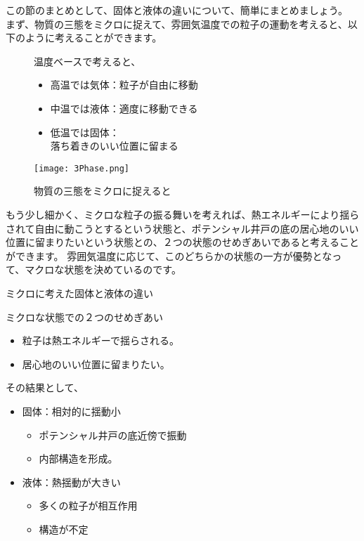 \documentclass[uplatex,dvipdfmx,a4paper,11pt]{jsarticle}
\begin{document}
この節のまとめとして、固体と液体の違いについて、簡単にまとめましょう。
まず、物質の三態をミクロに捉えて、雰囲気温度での粒子の運動を考えると、以下のように考えることができます。
\begin{figure}[htb]
	\begin{center}
		\begin{minipage}{0.48\textwidth}
			\large
			\begin{itembox}[l]{温度ベースで考えると、}
				\begin{itemize}
					\item 高温では気体：粒子が自由に移動
					\item 中温では液体：適度に移動できる
					\item 低温では固体：\\
					落ち着きのいい位置に留まる
				\end{itemize}
			\end{itembox}
		\end{minipage}
		\begin{minipage}{0.42\textwidth}
			\texttt{[image: 3Phase.png]}
		\end{minipage}
		\caption{物質の三態をミクロに捉えると}
		\label{fig:santai_micro}
	\end{center}
\end{figure}

もう少し細かく、ミクロな粒子の振る舞いを考えれば、熱エネルギーにより揺らされて自由に動こうとするという状態と、ポテンシャル井戸の底の居心地のいい位置に留まりたいという状態との、２つの状態のせめぎあいであると考えることができます。
雰囲気温度に応じて、このどちらかの状態の一方が優勢となって、マクロな状態を決めているのです。

\large
\begin{itembox}[l]{ミクロに考えた固体と液体の違い}
	\begin{itembox}[l]{ミクロな状態での２つのせめぎあい}
		\begin{itemize}
			\item 粒子は熱エネルギーで揺らされる。
			\item 居心地のいい位置に留まりたい。
		\end{itemize}
	\end{itembox}
	\begin{itembox}[l]{その結果として、}
		\begin{itemize}
			\item 固体：相対的に揺動小
			\begin{itemize}
				\item ポテンシャル井戸の底近傍で振動
				\item 内部構造を形成。
			\end{itemize}
			\item 液体：熱揺動が大きい
			\begin{itemize}
				\item 多くの粒子が相互作用
				\item 構造が不定
			\end{itemize}
		\end{itemize}
	\end{itembox}
\end{itembox}
\normalsize
\end{document}
